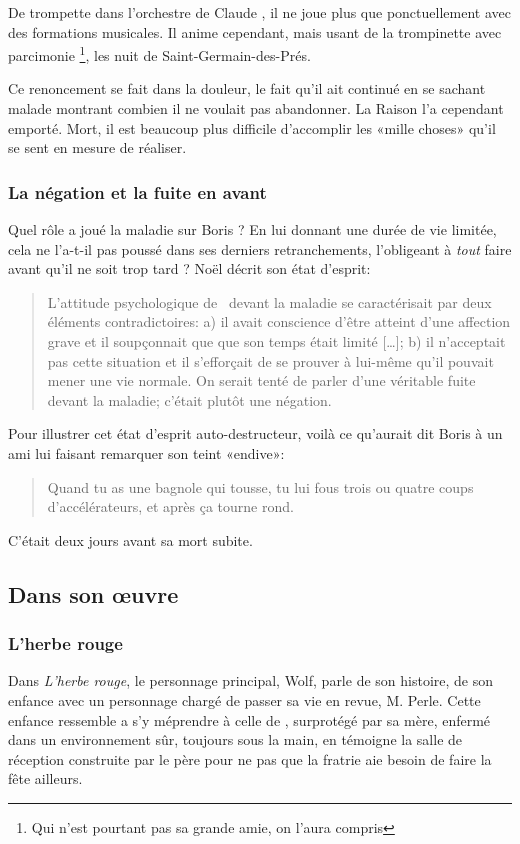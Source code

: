 De trompette dans l'orchestre de Claude , il ne joue plus que ponctuellement avec des
formations musicales. Il anime cependant, mais usant de la trompinette avec parcimonie
\footnote{Qui n'est pourtant pas sa grande amie, on l'aura compris}, les nuit de Saint-Germain-des-Prés.

Ce renoncement se fait dans la douleur, le fait qu'il ait continué en se sachant malade montrant
combien il ne voulait pas abandonner. La Raison l'a cependant emporté. Mort, il est beaucoup
plus difficile d'accomplir les «mille choses» qu'il se sent en mesure de réaliser.

\subsubsection{La négation et la fuite en avant}

Quel rôle a joué la maladie sur Boris ? En lui donnant une durée de vie limitée, cela
ne l'a-t-il pas poussé dans ses derniers retranchements, l'obligeant à \emph{tout} faire
avant qu'il ne soit trop tard ? Noël  décrit son état d'esprit:
{\small
\begin{quotation}
L'attitude psychologique de \BV\ devant la maladie se caractérisait par deux éléments
contradictoires: a) il avait conscience d'être atteint d'une affection grave et il soupçonnait que
que son temps était limité [\ldots]; b) il n'acceptait pas cette situation et il s'efforçait de se
prouver à lui-même qu'il pouvait mener une vie normale. On serait tenté de parler d'une
véritable fuite devant la maladie; c'était plutôt une négation.
\end{quotation}
}
Pour illustrer cet état d'esprit auto-destructeur, voilà ce qu'aurait dit
Boris à un ami lui faisant remarquer son teint «endive»:
{\small
\begin{quotation}
Quand tu as une bagnole qui tousse, tu lui fous trois ou quatre coups d'accélérateurs,
et après ça tourne rond.
\end{quotation}
}
C'était deux jours avant sa mort subite.


\subsection{Dans son \oe{}uvre}

\subsubsection{L'herbe rouge}
Dans \emph{L'herbe rouge}, le personnage principal, Wolf, parle de son histoire, de son enfance
avec un personnage chargé de passer sa vie en revue, M. Perle.
Cette enfance ressemble a s'y méprendre à celle de \BV, surprotégé
par sa mère, enfermé dans un environnement sûr, toujours sous la main, en témoigne la
salle de réception construite par le père pour ne pas que la fratrie aie besoin de faire
la fête ailleurs.

